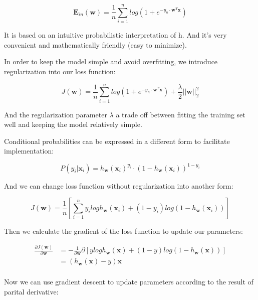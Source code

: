 \documentclass[journal, a4paper]{IEEEtran}
\begin{document}
\begin{equation}
\textbf{E}_{in}(\textbf{w})= \frac{1}{n} \sum_{i=1}^nlog(1+e^{-y_n\cdot\textbf{w}^T\textbf{x}})
\end{equation}

It is based on an intuitive probabilistic interpretation of h. And it's very convenient and mathematically friendly (easy to minimize).

In order to keep the model simple and avoid overfitting, we introduce regularization into our loss function:

\begin{equation}
J(\textbf{w})= \frac{1}{n} \sum_{i=1}^nlog(1+e^{-y_n\cdot\textbf{w}^T\textbf{x}}) + \frac{\lambda}{2} ||\textbf{w}||^2_2
\end{equation}	

And the regularization parameter $\lambda$ a trade off between fitting the training set well and keeping the model relatively simple.

Conditional probabilities can be expressed in a different form to facilitate implementation:

\begin{equation}
P(y_i|\textbf{x}_i) = h_\textbf{w}(\textbf{x}_i)^{y_i}\cdot(1 - h_\textbf{w}(\textbf{x}_i))^{1-y_i}
\end{equation}	

And we can change loss function without regularization into another form:

\begin{equation}
J(\textbf{w})= \frac{1}{n}[ \sum_{i=1}^ny_ilogh_\textbf{w}(\textbf{x}_i)+(1-y_i)log(1-h_\textbf{w}(\textbf{x}_i))]
\end{equation}	

Then we calculate the gradient of the loss function to update our parameters:

\begin{equation}
\begin{aligned}
\frac{\partial J(\textbf{w})}{\partial\textbf{w}}
&= -\frac{1}{\partial \textbf{w}}\partial[ylogh_\textbf{w}(\textbf{x})+(1-y)log(1-h_\textbf{w}(\textbf{x}))] \\
&= (h_\textbf{w}(\textbf{x})-y)\textbf{x} \\
\end{aligned}
\end{equation}	

Now we can use gradient descent to update parameters according to the result of parital derivative:
\end{document}
